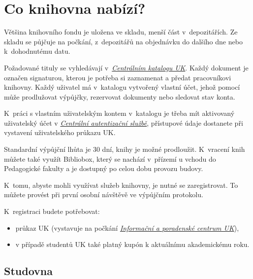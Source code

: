 \section{Co knihovna nabízí?}


{}

Většina knihovního fondu je uložena ve skladu, menší část
v~depozitářích. Ze skladu se půjčuje na počkání, z~depozitářů na
objednávku do dalšího dne nebo k~dohodnutému datu.


Požadované tituly se vyhledávají v~\href{http://ckis.cuni.cz/}{\emph{Centrálním katalogu UK}}. Každý
dokument je označen signaturou, kterou je potřeba si zaznamenat a předat
pracovníkovi knihovny. Každý uživatel má v~katalogu vytvořený vlastní
účet, jehož pomocí může prodlužovat výpůjčky, rezervovat dokumenty nebo
sledovat stav konta.

K~práci s vlastním uživatelským kontem v~katalogu je třeba mít
aktivovaný uživatelský účet v
\href{https://ldap1.cuni.cz/}{\emph{Centrální autentizační službě}},
přístupové údaje dostanete při vystavení uživatelského průkazu UK.


Standardní výpůjční lhůta je 30 dní, knihy je možné prodloužit.
K~vracení knih můžete také využít Bibliobox, který se nachází v~přízemí
u vchodu do Pedagogické fakulty a je dostupný po celou dobu provozu
budovy.


K~tomu, abyste mohli využívat služeb knihovny, je nutné se
zaregistrovat. To můžete provést při první osobní návštěvě ve výpůjčním
protokolu.

K~registraci budete potřebovat:

\begin{itemize}
\item
  průkaz UK (vystavuje na počkání
  \href{http://www.cuni.cz/UK-3249.html}{\emph{Informační a poradenské
  centrum UK}}),
\item
  v případě studentů UK také platný kupón k aktuálnímu akademickému
  roku.
\end{itemize}

\newpage
\subsection{Studovna}

